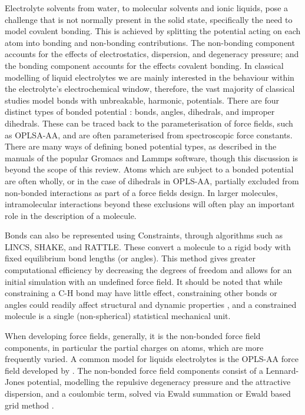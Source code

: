 \documentclass[../main.tex]{subfiles}
\begin{document}
Electrolyte solvents from water, to molecular solvents and ionic liquids, pose a challenge that is not normally present in the solid state, specifically the need to model covalent bonding. This is achieved by splitting the potential acting on each atom into bonding and non-bonding contributions. The non-bonding component accounts for the effects of electrostatics, dispersion, and degeneracy pressure; and the bonding component accounts for the effects covalent bonding. In classical modelling of liquid electrolytes we are mainly interested in the behaviour within the electrolyte's electrochemical window, therefore, the vast majority of classical studies model bonds with unbreakable, harmonic, potentials. There are four distinct types of bonded potential \cite{lindahl_gromacs_2021, frenkel_understanding_2002}: bonds, angles, dihedrals, and improper dihedrals. These can be traced back to the parameterisation of force fields, such as OPLSA-AA\cite{canongia_lopes_clp_2012,jorgensen_development_1996}, and are often parameterised from spectroscopic force constants. There are many ways of defining boned potential types, as described in the manuals of the popular Gromacs\cite{lindahl_gromacs_2021} and Lammps\cite{PLIMPTON19951} software, though this discussion is beyond the scope of this review. Atoms which are subject to a bonded potential are often wholly, or in the case of dihedrals in OPLS-AA, partially excluded from non-bonded interactions as part of a force fields design. In larger molecules, intramolecular interactions beyond these exclusions will often play an important role in the description of a molecule.

Bonds can also be represented using Constraints, through algorithms such as LINCS\cite{hess_lincs_1997}, SHAKE\cite{ryckaert_numerical_1977}, and RATTLE\cite{andersen_rattle_1983}. These convert a molecule to a rigid body with fixed equilibrium bond lengths (or angles). This method gives greater computational efficiency by decreasing the degrees of freedom and allows for an initial simulation with an undefined force field. It should be noted that while constraining a C-H bond may have little effect, constraining other bonds or angles could readily affect structural and dynamic properties \cite{de_wijn_internal_2011, hess_lincs_1997}, and a constrained molecule is a single (non-spherical) statistical mechanical unit.

When developing force fields, generally, it is the non-bonded force field components, in particular the partial charges on atoms, which are more frequently varied. A common model for liquids electrolytes is the OPLS-AA force field developed by \citeauthor{jorgensen_development_1996} \cite{jorgensen_development_1996}. The non-bonded force field components consist of a Lennard-Jones potential, modelling the repulsive degeneracy pressure and the attractive dispersion, and a coulombic term, solved via Ewald summation \cite{ewald_berechnung_1921} or Ewald based grid method \cite{darden_particle_1993,deserno_how_1998,yeh_ewald_1999}.
\end{document}
